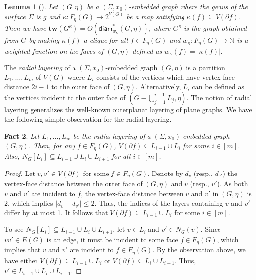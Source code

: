 \documentclass[a4paper,11pt]{article}
\newtheorem{lemma}{Lemma}
\numberwithin{lemma}{section}
\newtheorem{fact}[lemma]{Fact}
\newcommand{\tw}{\mathbf{tw}}
\begin{document}
\begin{lemma}[\cite{BandyapadhyayLLSJ22}]\label{lem-twdiam2}
Let $(G,\eta)$ be a $(\varSigma,x_0)$-embedded graph where the genus of the surface $\varSigma$ is $g$ and $\kappa: F_\eta(G) \rightarrow 2^{V(G)}$ be a map satisfying $\kappa(f) \subseteq V(\partial f)$.
Then we have $\tw(G^\kappa) = O(\mathsf{diam}_{w_\kappa}^*(G,\eta))$, where $G^\kappa$ is the graph obtained from $G$ by making $\kappa(f)$ a clique for all $f \in F_\eta(G)$ and $w_\kappa: F_\eta(G) \rightarrow \mathbb{N}$ is a weighted function on the faces of $(G,\eta)$ defined as $w_\kappa(f) = |\kappa(f)|$.
\end{lemma}

The \emph{radial layering} of a $(\varSigma,x_0)$-embedded graph $(G,\eta)$ is a partition $L_1,\dots,L_m$ of $V(G)$ where $L_i$ consists of the vertices which have vertex-face distance $2i-1$ to the outer face of $(G,\eta)$.
Alternatively, $L_i$ can be defined as the vertices incident to the outer face of $(G - \bigcup_{j=1}^{i-1} L_j, \eta)$.
The notion of radial layering generalizes the well-known outerplanar layering of plane graphs.
We have the following simple observation for the radial layering.

\begin{fact}\label{fact-diff1}
Let $L_1,\dots,L_m$ be the radial layering of a $(\varSigma,x_0)$-embedded graph $(G,\eta)$.
Then, for any $f \in F_\eta(G)$, $V(\partial f) \subseteq L_{i-1} \cup L_i$ for some $i \in [m]$.
Also, $N_G[L_i] \subseteq L_{i-1} \cup L_i \cup L_{i+1}$ for all $i \in [m]$.
\end{fact}

\begin{proof}
Let $v,v' \in V(\partial f)$ for some $f \in F_\eta(G)$.
Denote by $d_v$ (resp., $d_{v'}$) the vertex-face distance between the outer face of $(G,\eta)$ and $v$ (resp., $v'$).
As both $v$ and $v'$ are incident to $f$, the vertex-face distance between $v$ and $v'$ in $(G,\eta)$ is $2$, which implies $|d_v - d_{v'}| \leq 2$.
Thus, the indices of the layers containing $v$ and $v'$ differ by at most 1.
It follows that $V(\partial f) \subseteq L_{i-1} \cup L_i$ for some $i \in [m]$.

To see $N_G[L_i] \subseteq L_{i-1} \cup L_i \cup L_{i+1}$, let $v \in L_i$ and $v' \in N_G(v)$.
Since $vv' \in E(G)$ is an edge, it must be incident to some face $f \in F_\eta(G)$, which implies that $v$ and $v'$ are incident to $f \in F_\eta(G)$.
By the observation above, we have either $V(\partial f) \subseteq L_{i-1} \cup L_i$ or $V(\partial f) \subseteq L_i \cup L_{i+1}$.
Thus, $v' \in L_{i-1} \cup L_i \cup L_{i+1}$.
\end{proof}
\end{document}
